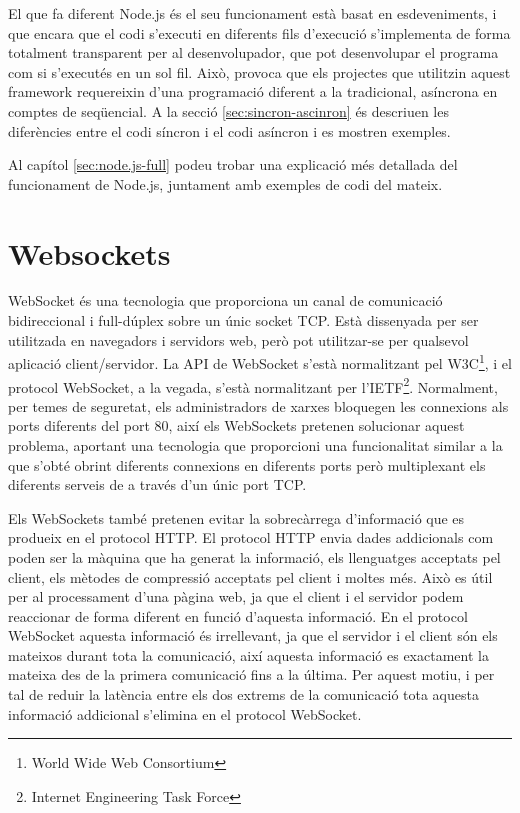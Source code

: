 El que fa diferent Node.js és el seu funcionament està basat en esdeveniments, i que encara que el codi s'executi en diferents fils d'execució s'implementa de forma totalment transparent per al desenvolupador, que pot desenvolupar el programa com si s'executés en un sol fil. Això, provoca que els projectes que utilitzin aquest framework requereixin d'una programació diferent a la tradicional, asíncrona en comptes de seqüencial. A la secció \ref{sec:sincron-ascinron} és descriuen les diferències entre el codi síncron i el codi asíncron i es mostren exemples.

Al capítol \ref{sec:node.js-full} podeu trobar una explicació més detallada del funcionament de Node.js, juntament amb exemples de codi del mateix.


\section{Websockets}
\label{sec:websockets}

WebSocket és una tecnologia que proporciona un canal de comunicació bidireccional i full-dúplex sobre un únic socket TCP. Està dissenyada per ser utilitzada en navegadors i servidors web, però pot utilitzar-se per qualsevol aplicació client/servidor. La API de WebSocket s'està normalitzant pel W3C\footnote{World Wide Web Consortium}, i el protocol WebSocket, a la vegada, s'està normalitzant per l'IETF\footnote{Internet Engineering Task Force}. Normalment, per temes de seguretat, els administradors de xarxes bloquegen les connexions als ports diferents del port 80, així els WebSockets pretenen solucionar aquest problema, aportant una tecnologia que proporcioni una funcionalitat similar a la que s'obté obrint diferents connexions en diferents ports però multiplexant els diferents serveis de a través d'un únic port TCP.

Els WebSockets també pretenen evitar la sobrecàrrega d'informació que es produeix en el protocol HTTP. El protocol HTTP envia dades addicionals com poden ser la màquina que ha generat la informació, els llenguatges acceptats pel client, els mètodes de compressió acceptats pel client i moltes més. Això es útil per al processament d'una pàgina web, ja que el client i el servidor podem reaccionar de forma diferent en funció d'aquesta informació. En el protocol WebSocket aquesta informació és irrellevant, ja que el servidor i el client són els mateixos durant tota la comunicació, així aquesta informació es exactament la mateixa des de la primera comunicació fins a la última. Per aquest motiu, i per tal de reduir la latència entre els dos extrems de la comunicació tota aquesta informació addicional s'elimina en el protocol WebSocket.


